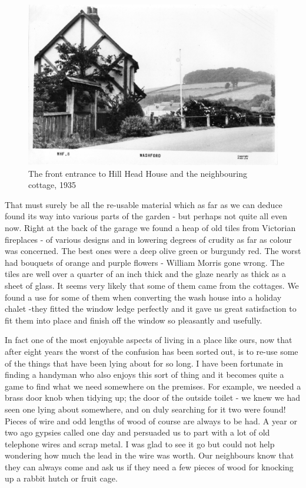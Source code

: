 \begin{figure}[p]
	\centering
     \includegraphics[width=1\textwidth]{figures/Postcard}
     \caption{The front entrance to Hill Head House and the neighbouring cottage, 1935}
     \label{fig:Postcard}
\end{figure}

\afterpage{\clearpage}

That must surely be all the re-usable material which as far as we can deduce found its way into various parts of the garden - but perhaps not quite all even now. Right at the back of the garage we found a heap of old tiles from Victorian fireplaces - of various designs and in lowering degrees of crudity as far as colour was concerned. The best ones were a deep olive green or burgundy red. The worst had bouquets of orange and purple flowers - William Morris gone wrong. The tiles are well over a quarter of an inch thick and the glaze nearly as thick as a sheet of glass. It seems very likely that some of them came from the cottages. We found a use for some of them when converting the wash house into a holiday chalet -they fitted the window ledge perfectly and it gave us great satisfaction to fit them into place and finish off the window so pleasantly and usefully.

In fact one of the most enjoyable aspects of living in a place like ours, now that after eight years the worst of the confusion has been sorted out, is to re-use some of the things that have been lying about for so long. I have been fortunate in finding a handyman who also enjoys this sort of thing and it becomes quite a game to find what we need somewhere on the premises. For example, we needed a brass door knob when tidying up; the door of the outside toilet - we knew we had seen one lying about somewhere, and on duly searching for it two were found! Pieces of wire and odd lengths of wood of course are always to be had. A year or two ago gypsies called one day and persuaded us to part with a lot of old telephone wires and scrap metal. I was glad to see it go but could not help wondering how	much the lead in the wire was worth. Our neighbours know that they can always come and ask us if they need a few pieces of wood for knocking up a rabbit hutch or fruit cage.

